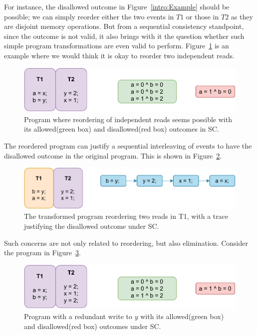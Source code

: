     For instance, the disallowed outcome in Figure~\ref{intro:Example} should be possible; we can simply reorder either the two events in $T1$ or those in $T2$ as they are disjoint memory operations. 
    But from a sequential consistency standpoint, since the outcome is not valid, it also brings with it the question whether such simple program transformations are even valid to perform.
    Figure~\ref{intro:Example2(a)} is an example where we would think it is okay to reorder two independent reads. 
    \begin{figure}[H]
        \centering
        \includegraphics[scale=0.7]{2.Background/SC_Reordering(a).pdf}
        \caption{Program where reordering of independent reads seems possible with its allowed(green box) and disallowed(red box) outcomes in SC.}
        \label{intro:Example2(a)}
    \end{figure}

    The reordered program can justify a sequential interleaving of events to have the disallowed outcome in the original program. 
    This is shown in Figure~\ref{intro:Example2(b)}.
    \begin{figure}[H]
        \centering
        \includegraphics[scale=0.7]{2.Background/SC_Reordering(b).pdf}
        \caption{The transformed program reordering two reads in T1, with a trace justifying the disallowed outcome under SC.}
        \label{intro:Example2(b)}
    \end{figure}

    Such concerns are not only related to reordering, but also elimination. 
    Consider the program in Figure~\ref{intro:Example3(a)}.
    \begin{figure}[H]
        \centering
        \includegraphics[scale=0.7]{2.Background/SC_Example2(a).pdf}
        \caption{Program with a redundant write to $y$ with its allowed(green box) and disallowed(red box) outcomes under SC.}
        \label{intro:Example3(a)}
    \end{figure}

